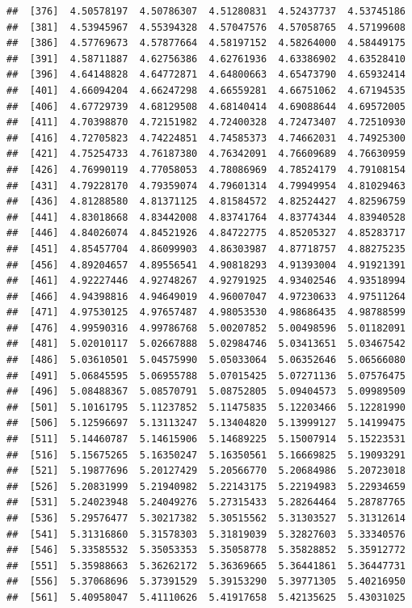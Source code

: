 \documentclass[
  11pt]{report}
\begin{document}
\begin{itemize}
\begin{verbatim}
##  [376]  4.50578197  4.50786307  4.51280831  4.52437737  4.53745186
##  [381]  4.53945967  4.55394328  4.57047576  4.57058765  4.57199608
##  [386]  4.57769673  4.57877664  4.58197152  4.58264000  4.58449175
##  [391]  4.58711887  4.62756386  4.62761936  4.63386902  4.63528410
##  [396]  4.64148828  4.64772871  4.64800663  4.65473790  4.65932414
##  [401]  4.66094204  4.66247298  4.66559281  4.66751062  4.67194535
##  [406]  4.67729739  4.68129508  4.68140414  4.69088644  4.69572005
##  [411]  4.70398870  4.72151982  4.72400328  4.72473407  4.72510930
##  [416]  4.72705823  4.74224851  4.74585373  4.74662031  4.74925300
##  [421]  4.75254733  4.76187380  4.76342091  4.76609689  4.76630959
##  [426]  4.76990119  4.77058053  4.78086969  4.78524179  4.79108154
##  [431]  4.79228170  4.79359074  4.79601314  4.79949954  4.81029463
##  [436]  4.81288580  4.81371125  4.81584572  4.82524427  4.82596759
##  [441]  4.83018668  4.83442008  4.83741764  4.83774344  4.83940528
##  [446]  4.84026074  4.84521926  4.84722775  4.85205327  4.85283717
##  [451]  4.85457704  4.86099903  4.86303987  4.87718757  4.88275235
##  [456]  4.89204657  4.89556541  4.90818293  4.91393004  4.91921391
##  [461]  4.92227446  4.92748267  4.92791925  4.93402546  4.93518994
##  [466]  4.94398816  4.94649019  4.96007047  4.97230633  4.97511264
##  [471]  4.97530125  4.97657487  4.98053530  4.98686435  4.98788599
##  [476]  4.99590316  4.99786768  5.00207852  5.00498596  5.01182091
##  [481]  5.02010117  5.02667888  5.02984746  5.03413651  5.03467542
##  [486]  5.03610501  5.04575990  5.05033064  5.06352646  5.06566080
##  [491]  5.06845595  5.06955788  5.07015425  5.07271136  5.07576475
##  [496]  5.08488367  5.08570791  5.08752805  5.09404573  5.09989509
##  [501]  5.10161795  5.11237852  5.11475835  5.12203466  5.12281990
##  [506]  5.12596697  5.13113247  5.13404820  5.13999127  5.14199475
##  [511]  5.14460787  5.14615906  5.14689225  5.15007914  5.15223531
##  [516]  5.15675265  5.16350247  5.16350561  5.16669825  5.19093291
##  [521]  5.19877696  5.20127429  5.20566770  5.20684986  5.20723018
##  [526]  5.20831999  5.21940982  5.22143175  5.22194983  5.22934659
##  [531]  5.24023948  5.24049276  5.27315433  5.28264464  5.28787765
##  [536]  5.29576477  5.30217382  5.30515562  5.31303527  5.31312614
##  [541]  5.31316860  5.31578303  5.31819039  5.32827603  5.33340576
##  [546]  5.33585532  5.35053353  5.35058778  5.35828852  5.35912772
##  [551]  5.35988663  5.36262172  5.36369665  5.36441861  5.36447731
##  [556]  5.37068696  5.37391529  5.39153290  5.39771305  5.40216950
##  [561]  5.40958047  5.41110626  5.41917658  5.42135625  5.43031025

\end{verbatim}
\end{itemize}
\end{document}
